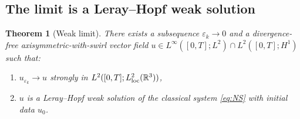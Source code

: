 \documentclass{article}
\newtheorem{theorem}{Theorem}[section]
\theoremstyle{definition}
\theoremstyle{remark}
\newcommand{\R}{\mathbb{R}}
\newcommand{\e}{\varepsilon}
\begin{document}
\subsection{The limit is a Leray--Hopf weak solution}

\begin{theorem}[Weak limit]\label{thm:limit}
  There exists a subsequence $\e_k\to 0$ and a divergence-free
  axisymmetric-with-swirl vector field $u\in L^\infty([0,T];L^2)\cap
  L^2([0,T];H^1)$ such that:
  \begin{enumerate}
  \item[\textup{(i)}]
    $u_{\e_k}\to u$ strongly in $L^2([0,T];L^2_{\rm loc}(\R^3))$,
  \item[\textup{(ii)}]
    $u$ is a Leray--Hopf weak solution of the classical system
    \eqref{eq:NS} with initial data $u_0$.
  \end{enumerate}
\end{theorem}
\end{document}
